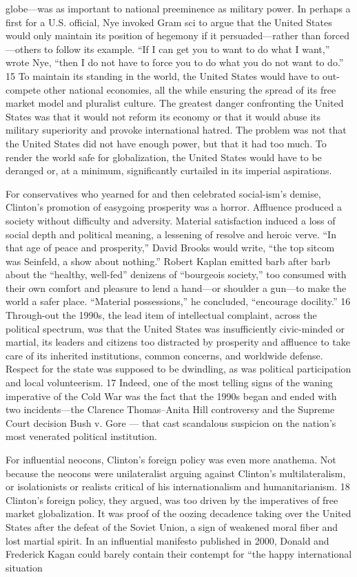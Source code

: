globe—was as important to national preeminence as military power. In perhaps a first for a U.S. official, Nye invoked Gram sci to argue that the United States would only maintain its position of hegemony if it persuaded—rather than forced—others to follow its example. “If I can get you to want to do what I want,” wrote Nye, “then I do not have to force you to do what you do not want to do.” {\color{blue} 15 } To maintain its standing in the world, the United States would have to out-compete other national economies, all the while ensuring the spread of its free market model and pluralist culture. The greatest danger confronting the United States was that it would not reform its economy or that it would abuse its military superiority and provoke international hatred. The problem was not that the United States did not have enough power, but that it had too much. To render the world safe for globalization, the United States would have to be deranged or, at a minimum, significantly curtailed in its imperial aspirations.{\par} For conservatives who yearned for and then celebrated social-ism’s demise, Clinton’s promotion of easygoing prosperity was a horror. Affluence produced a society without difficulty and adversity. Material satisfaction induced a loss of social depth and political meaning, a lessening of resolve and heroic verve. “In that age of peace and prosperity,” David Brooks would write, “the top sitcom was Seinfeld, a show about nothing.” Robert Kaplan emitted barb after barb about the “healthy, well-fed” denizens of “bourgeois society,” too consumed with their own comfort and pleasure to lend a hand—or shoulder a gun—to make the world a safer place. “Material possessions,” he concluded, “encourage docility.” {\color{blue} 16 } Through-out the 1990s, the lead item of intellectual complaint, across the political spectrum, was that the United States was insufficiently civic-minded or martial, its leaders and citizens too distracted by prosperity and affluence to take care of its inherited institutions, common concerns, and worldwide defense. Respect for the state was supposed to be dwindling, as was political participation and local volunteerism. {\color{blue} 17 } Indeed, one of the most telling signs of the waning imperative of the Cold War was the fact that the 1990s began and ended with two incidents—the Clarence Thomas–Anita Hill controversy and the Supreme Court decision Bush v. Gore — that cast scandalous suspicion on the nation’s most venerated political institution.{\par} For influential neocons, Clinton’s foreign policy was even more anathema. Not because the neocons were unilateralist arguing against Clinton’s multilateralism, or isolationists or realists critical of his internationalism and humanitarianism. {\color{blue} 18 } Clinton’s foreign policy, they argued, was too driven by the imperatives of free market globalization. It was proof of the oozing decadence taking over the United States after the defeat of the Soviet Union, a sign of weakened moral fiber and lost martial spirit. In an influential manifesto published in 2000, Donald and Frederick Kagan could barely contain their contempt for “the happy international situation 
